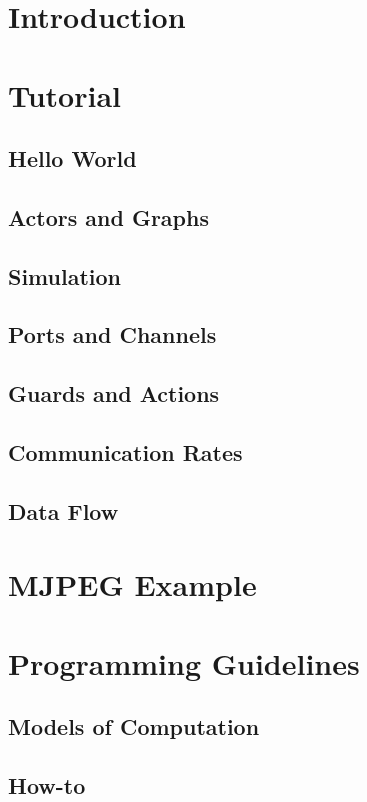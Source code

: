 \section{Introduction}

\section{Tutorial}
\subsection{Hello World}

\subsection{Actors and Graphs}

\subsection{Simulation}

\subsection{Ports and Channels}

\subsection{Guards and Actions}

\subsection{Communication Rates}

\subsection{Data Flow}



\section{MJPEG Example}
\section{Programming Guidelines}
\subsection{Models of Computation}

\subsection{How-to}




